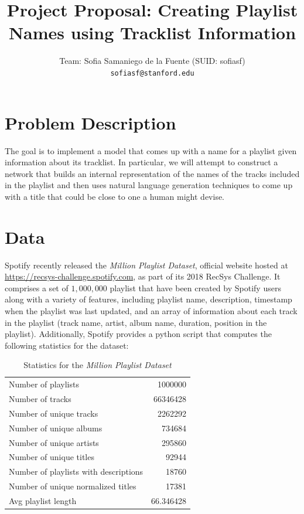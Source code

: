 \documentclass{article} %
\title{Project Proposal: Creating Playlist Names using Tracklist Information}
\author{
    Team: Sofia Samaniego de la Fuente (SUID: sofiasf) \\
    \texttt{\footnotesize sofiasf@stanford.edu} \\
}
\begin{document}
\maketitle


\section{Problem Description}
\label{description}
The goal is to implement a model that comes up with a name for a playlist given information about its tracklist. 
In particular, we will attempt to construct a network that builds an internal representation of the names of the tracks included in the playlist and then uses natural language generation techniques to come up with a title that could be close to one a human might devise. 

\section{Data}
\label{data}
Spotify recently released the \emph{Million Playlist Dataset}, official website hosted at \href{https://recsys-challenge.spotify.com}{https://recsys-challenge.spotify.com}, as part of its 2018 RecSys Challenge.
It comprises a set of $1,000,000$ playlist that have been created by Spotify users along with a variety of features, including playlist name, description, timestamp when the playlist was last updated, and an array of information about each track in the playlist (track name, artist, album name, duration, position in the playlist).
Additionally, Spotify provides a \textsf{python} script that computes the following statistics for the dataset:

\begin{table}[h!]
\caption{Statistics for the \emph{Million Playlist Dataset}}
\centering
 \begin{tabular}{|lr|} 
 \hline
 	Number of playlists & 1000000 \\
	Number of tracks & 66346428 \\
	Number of unique tracks & 2262292 \\
	Number of unique albums & 734684 \\
	Number of unique artists & 295860 \\
	Number of unique titles & 92944 \\
	Number of playlists with descriptions & 18760 \\
	Number of unique normalized titles & 17381 \\
	Avg playlist length & 66.346428 \\     
 \hline
 \end{tabular}
\end{table}
\end{document}
